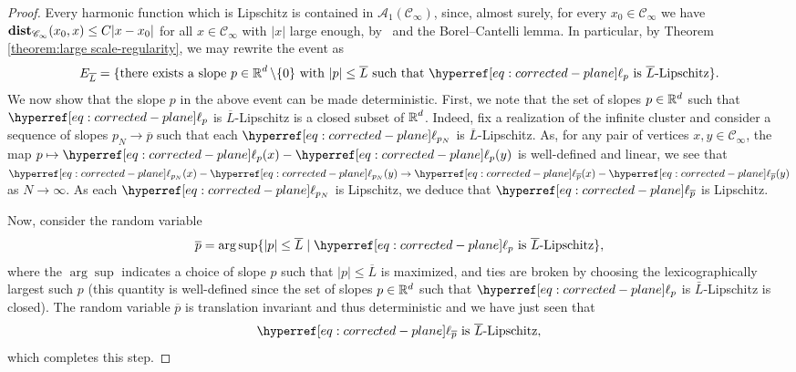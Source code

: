 \documentclass[12pt]{amsart}
\numberwithin{equation}{section}
\begin{document}
\begin{proof}
		Every harmonic function which is Lipschitz is contained in $\mathcal{A}_1(\mathscr{C}_{\infty})$, since, almost surely, for every $x_0 \in \mathscr{C}_\infty$ we have $\operatorname{\mathop{\bf dist{}}}_{\mathscr{C}_\infty}(x_0 , x) \leq C |x - x_0|$ for all $x \in \mathscr{C}_\infty$ with $|x|$ large enough, by~\cite[Theorem 1.1]{antal-pisztora-chemical} and the Borel--Cantelli lemma. In particular, by Theorem \ref{theorem:large scale-regularity},
		we may rewrite the event as 
		\[
		E_{\overline{L}} = \{ \mbox{there exists a slope $p \in \R^d \setminus \{ 0 \}$ with $|p| \leq \overline{L}$ such that $\ellp{p}$ is $\overline{L}$-Lipschitz} \}.
		\]	
		We now show that the slope $p$ in the above event can be made deterministic. First, we note that the set of slopes $p \in \mathbb{R}^d$ such that $\ellp{p}$ is $\overline{L}$-Lipschitz is a closed subset of $\operatorname{\mathbb{R}}^d$.  
		Indeed, fix a realization of the infinite cluster and consider a sequence of slopes $p_N \to \overline{p}$ such that each $\ellp{p_N}$ is $\overline{L}$-Lipschitz. As, for any pair of vertices $x , y \in \mathscr{C}_\infty$, the map $p \mapsto \ellp{p}(x) - \ellp{p}(y)$ is well-defined and linear, we see that $\ellp{p_N}(x) - \ellp{p_N}(y) \to \ellp{\overline{p}}(x) - \ellp{\overline{p}}(y)$ as $N \to \infty$. 
		As each $\ellp{p_N}$ is Lipschitz, we deduce that $\ellp{\overline{p}}$ is Lipschitz.
		
		Now,  consider the random variable
		\[
		\overline{p} = \arg \sup \{  |p| \leq \overline{L}  \mid \mbox{$\ellp{p}$ is $\overline{L}$-Lipschitz} \},
		\]
		where the $\arg \sup$ indicates a choice of slope $p$ such that $|p| \leq \overline{L}$ is maximized, 
		and ties are broken by choosing the lexicographically largest such $p$ (this quantity is well-defined since the set of slopes $p \in \mathbb{R}^d$ such that $\ellp{p}$ is $\bar L$-Lipschitz is closed).  The random variable $\overline{p}$ is translation invariant and thus deterministic and we have just seen that
		\begin{equation} \label{eq:det-p-lipschitz}
			\ellp{\overline{p}} \mbox{ is $\overline{L}$-Lipschitz},
		\end{equation}
		which completes this step. 
		\medskip 
		

\end{proof}
\end{document}
